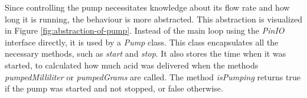 Since controlling the pump necessitates knowledge about its flow rate and how long it is running, the behaviour is more abstracted.
This abstraction is visualized in Figure \ref{fig:abstraction-of-pump}.
Instead of the main loop using the \textit{PinIO} interface directly, it is used by a \textit{Pump} class.
This class encapsulates all the necessary methods, such as \textit{start} and \textit{stop}.
It also stores the time when it was started, to calculated how much acid was delivered when the methods \textit{pumpedMilliliter} or \textit{pumpedGrams} are called.
The method \textit{isPumping} returns true if the pump was started and not stopped, or false otherwise.